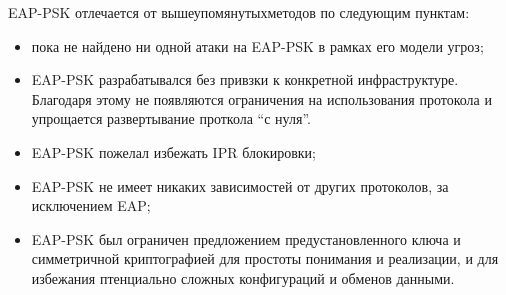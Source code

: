 EAP-PSK отлечается от вышеупомянутыхметодов по следующим пунктам:

\begin{itemize}
\item пока не найдено ни одной атаки на EAP-PSK в рамках его модели угроз;
\item EAP-PSK разрабатывался без привзки к конкретной инфраструктуре. Благодаря этому не появляются ограничения на использования протокола и упрощается развертывание проткола ``с нуля''.
\item EAP-PSK пожелал избежать IPR блокировки;
\item EAP-PSK не имеет никаких зависимостей от других протоколов, за исключением EAP;
\item EAP-PSK был ограничен предложением предустановленного ключа и симметричной криптографией для простоты понимания и реализации, и для избежания птенциально сложных конфигураций и обменов данными.
\end{itemize}
